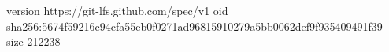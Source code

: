 version https://git-lfs.github.com/spec/v1
oid sha256:5674f59216c94cfa55eb0f0271ad96815910279a5bb0062def9f935409491f39
size 212238
